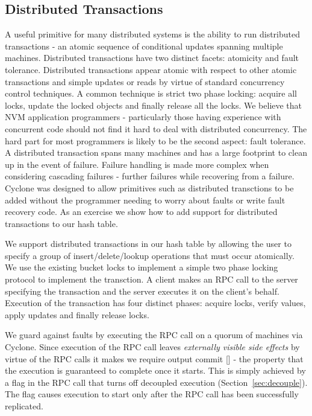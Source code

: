 \documentclass[letterpaper,twocolumn,10pt]{article}
\begin{document}
\subsection{Distributed Transactions}
A useful primitive for many distributed systems is the ability to run
distributed transactions - an atomic sequence of conditional updates spanning
multiple machines. Distributed transactions have two distinct facets: atomicity
and fault tolerance. Distributed transactions appear atomic with respect to
other atomic transactions and simple updates or reads by virtue of standard
concurrency control techniques. A common technique is strict two phase
locking: acquire all locks, update the locked objects and finally release all
the locks. We believe that NVM application programmers - particularly those
having experience with concurrent code should not find it hard to deal with
distributed concurrency. The hard part for most programmers is likely to be the
second aspect: fault tolerance. A distributed transaction spans many machines
and has a large footprint to clean up in the event of failure. Failure handling
is made more complex when considering cascading failures - further failures
while recovering from a failure. Cyclone was designed to allow primitives such
as distributed transctions to be added without the programmer needing to worry
about faults or write fault recovery code. As an exercise we show how to add
support for distributed transactions to our hash table.

We support distributed transactions in our hash table by allowing the user to
specify a group of insert/delete/lookup operations that must occur
atomically. We use the existing bucket locks to implement a simple two phase
locking protocol to implement the transction. A client makes an RPC call to the
server specifying the transaction and the server executes it on the client's
behalf. Execution of the transaction has four distinct phases: acquire locks,
verify values, apply updates and finally release locks.

We guard against faults by executing the RPC call on a quorum of
machines via Cyclone. Since execution of the RPC call leaves \emph{externally
  visible side effects} by virtue of the RPC calls it makes we require output
commit [] - the property that the execution is guaranteed to complete once it
starts. This is simply achieved by a flag in the RPC call that turns off
decoupled execution (Section~\ref{sec:decouple}). The flag causes execution to
start only after the RPC call has been successfully replicated.
\end{document}

